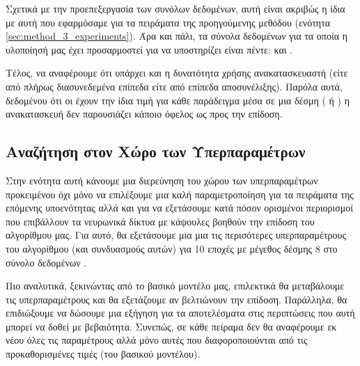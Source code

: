 Σχετικά με την προεπεξεργασία των συνόλων δεδομένων, αυτή είναι ακριβώς η ίδια με αυτή που εφαρμόσαμε για τα πειράματα της προηγούμενης μεθόδου (ενότητα \ref{sec:method_3_experiments}). Άρα και πάλι, τα σύνολα δεδομένων για τα οποία η υλοποίησή μας έχει προσαρμοστεί για να υποστηρίζει είναι πέντε:  και .\par

Τέλος, να αναφέρουμε ότι υπάρχει και η δυνατότητα χρήσης ανακατασκευαστή (είτε από πλήρως διασυνεδεμένα επίπεδα είτε από επίπεδα αποσυνέλιξης). Παρόλα αυτά, δεδομένου ότι οι  έχουν την ίδια τιμή για κάθε παράδειγμα μέσα σε μια δέσμη ( ή ) η ανακατασκευή δεν παρουσιάζει κάποιο όφελος ως προς την επίδοση.

\subsection{Αναζήτηση στον Χώρο των Υπερπαραμέτρων}

Στην ενότητα αυτή κάνουμε μια διερεύνηση του χώρου των υπερπαραμέτρων προκειμένου όχι μόνο να επιλέξουμε μια καλή παραμετροποίηση για τα πειράματα της επόμενης υποενότητας αλλά και για να εξετάσουμε κατά πόσον ορισμένοι περιορισμοί που επιβάλλουν τα νευρωνικά δίκτυα με κάψουλες βοηθούν την επίδοση του αλγορίθμου μας. Για αυτό, θα εξετάσουμε μια μια τις περισότερες υπερπαραμέτρους του αλγορίθμου (και συνδυασμούς αυτών) για 10 εποχές με μέγεθος δέσμης 8 στο σύνολο δεδομένων .\par

Πιο αναλυτικά, ξεκινώντας από το βασικό  μοντέλο μας, επιλεκτικά θα μεταβάλουμε τις υπερπαραμέτρους και θα εξετάζουμε αν βελτιώνουν την επίδοση. Παράλληλα, θα επιδιώξουμε να δώσουμε μια εξήγηση για τα αποτελέσματα στις περιπτώσεις που αυτή μπορεί να δοθεί με βεβαιότητα. Συνεπώς, σε κάθε πείραμα δεν θα αναφέρουμε εκ νέου όλες τις παραμέτρους αλλά μόνο αυτές που διαφοροποιούνται από τις προκαθορισμένες τιμές (του βασικού μοντέλου).\par

